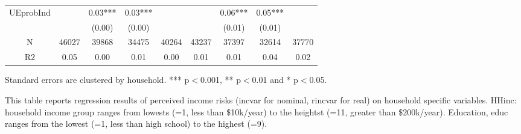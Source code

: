 \begin{table}[ht]
\begin{adjustbox}{width={0.9\textwidth},totalheight={\textheight}}
\begin{threeparttable}
\begin{tabular}{ccccccccc}
UEprobInd    &          &   0.03*** &    0.03*** &             &           &    0.06*** &     0.05*** &              \\
             &          &    (0.00) &     (0.00) &             &           &     (0.01) &      (0.01) &              \\
N            &    46027 &     39868 &      34475 &       40264 &     43237 &      37397 &       32614 &        37770 \\
R2           &     0.05 &      0.00 &       0.01 &        0.00 &      0.01 &       0.01 &        0.04 &         0.02 \\
\bottomrule
\end{tabular}
\begin{tablenotes}\item Standard errors are clustered by household. *** p$<$0.001, ** p$<$0.01 and * p$<$0.05. 
\item This table reports regression results of perceived income risks (incvar for nominal, rincvar for real) on household specific variables. HHinc: household income group ranges from lowests (=1, less than \$10k/year) to the heightst (=11, greater than \$200k/year). Education, educ ranges from the lowest (=1, less than high school) to the highest (=9).
\end{tablenotes}
\end{threeparttable}
\end{adjustbox}
\end{table}